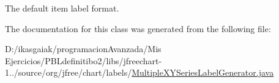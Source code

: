 The default item label format. 

The documentation for this class was generated from the following file\+:\begin{DoxyCompactItemize}
\item 
D\+:/ikasgaiak/programacion\+Avanzada/\+Mis Ejercicios/\+P\+B\+Ldefinitibo2/libs/jfreechart-\/1../source/org/jfree/chart/labels/\mbox{\hyperlink{_multiple_x_y_series_label_generator_8java}{Multiple\+X\+Y\+Series\+Label\+Generator.\+java}}\end{DoxyCompactItemize}
